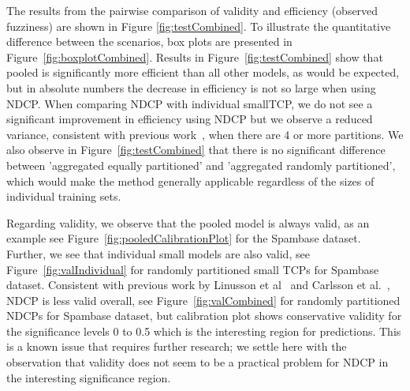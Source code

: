 \documentclass[main]{subfiles}
\begin{document}
The results from the pairwise comparison of validity and efficiency (observed fuzziness) are shown in Figure \ref{fig:testCombined}. To illustrate the quantitative difference between the scenarios, box plots are presented in Figure~\ref{fig:boxplotCombined}.
%
Results in Figure~\ref{fig:testCombined} show that pooled is significantly more efficient than all other models, as would be expected, but in absolute numbers the decrease in efficiency is not so large when using NDCP. When comparing NDCP with individual smallTCP, we do not see a significant improvement in efficiency using NDCP but we observe a reduced variance, consistent with previous work~\citep{Carlsson:2014qr}, when there are 4 or more partitions. We also observe in Figure~\ref{fig:testCombined} that there is no significant difference between 'aggregated equally partitioned' and 'aggregated randomly partitioned', which would make the method generally applicable regardless of the sizes of individual training sets.


Regarding validity, we observe that the pooled model is always valid, as an example see Figure~\ref{fig:pooledCalibrationPlot} for the Spambase dataset. Further, we see that individual small models are also valid, see Figure~\ref{fig:valIndividual} for randomly partitioned small TCPs for Spambase dataset. Consistent with previous work by Linusson et al~\cite{Linusson:2017dn} and Carlsson et al.~\cite{Carlsson:2014qr}, NDCP is less valid overall, see Figure~\ref{fig:valCombined} for randomly partitioned NDCPs for Spambase dataset, but calibration plot shows conservative validity for the significance levels 0 to 0.5 which is the interesting region for predictions. This is a known issue that requires further research; we settle here with the observation that validity does not seem to be a practical problem for NDCP in the interesting significance region.
\end{document}
